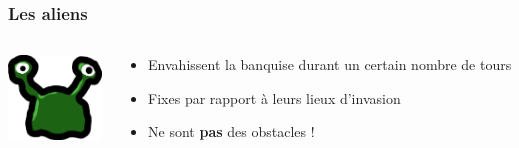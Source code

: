 \documentclass{beamer}
\begin{document}
\begin{frame}
    \frametitle{Les aliens}
    \begin{columns}[T]
        \begin{column}{.2\textwidth}
            \includegraphics[width=2.5cm]{../img/alien_big}
        \end{column}
        \begin{column}{.8\textwidth}
            \begin{itemize}
                \item Envahissent la banquise durant un certain nombre de tours
                \item Fixes par rapport à leurs lieux d'invasion
                \item Ne sont \textbf{pas} des obstacles !
            \end{itemize}
        \end{column}
    \end{columns}
\end{frame}
\end{document}
